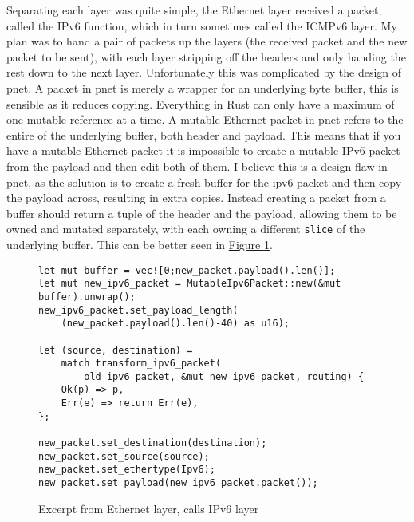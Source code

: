 \documentclass[12pt,a4paper,twoside,openright]{report}
\begin{document}
\bigskip

Separating each layer was quite simple, the Ethernet layer received a packet, called the IPv6 function, which in turn sometimes called the ICMPv6 layer.  My plan was to hand a pair of packets up the layers (the received packet and the new packet to be sent), with each layer stripping off the headers and only handing the rest down to the next layer.  Unfortunately this was complicated by the design of pnet.  A packet in pnet is merely a wrapper for an underlying byte buffer, this is sensible as it reduces copying.  Everything in Rust can only have a maximum of one mutable reference at a time.  A mutable Ethernet packet in pnet refers to the entire of the underlying buffer, both header and payload.  This means that if you have a mutable Ethernet packet it is impossible to create a mutable IPv6 packet from the payload and then edit both of them.  I believe this is a design flaw in pnet, as the solution is to create a fresh buffer for the ipv6 packet and then copy the payload across, resulting in extra copies. Instead creating a packet from a buffer should return a tuple of the header and the payload, allowing them to be owned and mutated separately, with each owning a different \verb!slice! of the underlying buffer. This can be better seen in  \hyperref[fig::mutability]{Figure }\ref{fig::mutability}.

\begin{figure}
\centering
\begin{varwidth}{\linewidth}
\begin{verbatim}
let mut buffer = vec![0;new_packet.payload().len()];
let mut new_ipv6_packet = MutableIpv6Packet::new(&mut buffer).unwrap();
new_ipv6_packet.set_payload_length(
    (new_packet.payload().len()-40) as u16);

let (source, destination) = 
    match transform_ipv6_packet(
        old_ipv6_packet, &mut new_ipv6_packet, routing) {
    Ok(p) => p,
    Err(e) => return Err(e),
};

new_packet.set_destination(destination);
new_packet.set_source(source);
new_packet.set_ethertype(Ipv6);
new_packet.set_payload(new_ipv6_packet.packet());
\end{verbatim}
\end{varwidth}
\caption{Excerpt from Ethernet layer, calls IPv6 layer}
\label{fig::mutability}
\end{figure}

\bigskip
\end{document}
